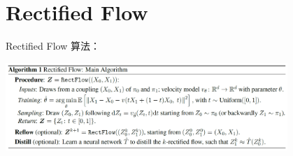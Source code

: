 \section{Rectified Flow}

\begin{frame}{Rectified Flow}
    算法：
    \begin{center}
        \includegraphics[width=0.8\textwidth]{assets/rf.png}
    \end{center}
\end{frame}